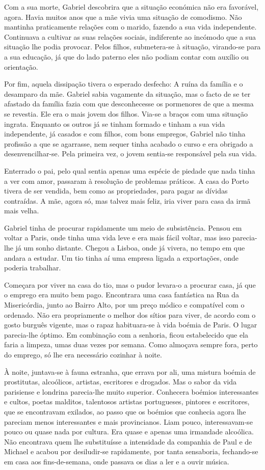 Com a sua morte, Gabriel descobrira que a situação económica não era
favorável, agora. Havia muitos anos que a mãe vivia uma situação de
comodismo. Não mantinha praticamente relações com o marido, fazendo a
sua vida independente. Continuava a cultivar as suas relações sociais,
indiferente ao incómodo que a sua situação lhe podia provocar. Pelos
filhos, submetera-se à situação, virando-se para a sua educação, já que
do lado paterno eles não podiam contar com auxílio ou orientação.

Por fim, aquela dissipação tivera o esperado desfecho: A ruína da
família e o desamparo da mãe. Gabriel sabia vagamente da situação, mas o
facto de se ter afastado da família fazia com que desconhecesse os
pormenores de que a mesma se revestia. Ele era o mais jovem dos filhos.
Via-se a braços com uma situação ingrata. Enquanto os outros já se
tinham formado e tinham a sua vida independente, já casados e com
filhos, com bons empregos, Gabriel não tinha profissão a que se
agarrasse, nem sequer tinha acabado o curso e era obrigado a
desenvencilhar-se. Pela primeira vez, o jovem sentia-se responsável pela
sua vida.

Enterrado o pai, pelo qual sentia apenas uma espécie de piedade que nada
tinha a ver com amor, passaram à resolução de problemas práticos. A casa
do Porto tivera de ser vendida, bem como as propriedades, para pagar as
dívidas contraídas. A mãe, agora só, mas talvez mais feliz, iria viver
para casa da irmã mais velha.

Gabriel tinha de procurar rapidamente um meio de subsistência. Pensou em
voltar a Paris, onde tinha uma vida leve e era mais fácil voltar, mas
isso parecia-lhe já um sonho distante. Chegou a Lisboa, onde já vivera,
no tempo em que andara a estudar. Um tio tinha aí uma empresa ligada a
exportações, onde poderia trabalhar.

Começara por viver na casa do tio, mas o pudor levara-o a procurar casa,
já que o emprego era muito bem pago. Encontrara uma casa fantástica na
Rua da Misericórdia, junto ao Bairro Alto, por um preço módico e
compatível com o ordenado. Não era propriamente o melhor dos sítios para
viver, de acordo com o gosto burguês vigente, mas o rapaz habituara-se à
vida boémia de Paris. O lugar parecia-lhe óptimo. Em combinação com a
senhoria, ficou estabelecido que ela faria a limpeza, umas duas vezes
por semana. Como almoçava sempre fora, perto do emprego, só lhe era
necessário cozinhar à noite.

À noite, juntava-se à fauna estranha, que errava por ali, uma mistura
boémia de prostitutas, alcoólicos, artistas, escritores e drogados. Mas
o sabor da vida parisiense e londrina parecia-lhe muito superior.
Conhecera boémios interessantes e cultos, poetas malditos, talentosos
artistas portugueses, pintores e escritores, que se encontravam
exilados, ao passo que os boémios que conhecia agora lhe pareciam menos
interessantes e mais provincianos. Liam pouco, interessavam-se pouco ou
quase nada por cultura. Era quase e apenas uma irmandade alcoólica. Não
encontrava quem lhe substituísse a intensidade da companhia de Paul e de
Michael e acabou por desiludir-se rapidamente, por tanta sensaboria,
fechando-se em casa aos fins-de-semana, onde passava os dias a ler e a
ouvir música.

